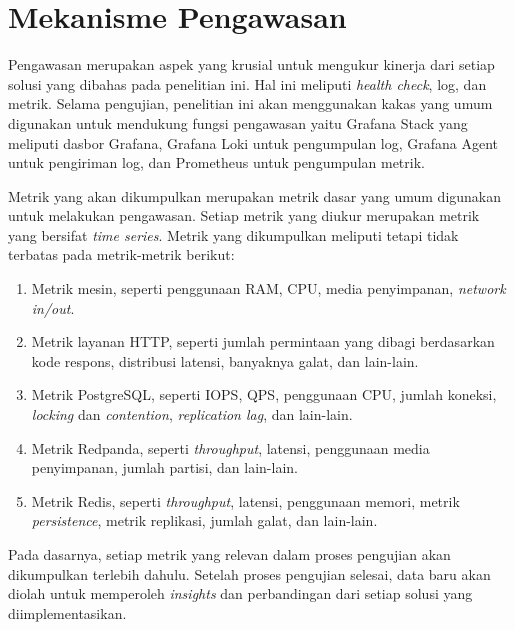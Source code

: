 \section{Mekanisme Pengawasan}

Pengawasan merupakan aspek yang krusial untuk mengukur kinerja dari setiap solusi yang dibahas pada penelitian ini. Hal ini meliputi \textit{health check}, log, dan metrik. Selama pengujian, penelitian ini akan menggunakan kakas yang umum digunakan untuk mendukung fungsi pengawasan yaitu Grafana Stack yang meliputi dasbor Grafana, Grafana Loki untuk pengumpulan log, Grafana Agent untuk pengiriman log, dan Prometheus untuk pengumpulan metrik.

Metrik yang akan dikumpulkan merupakan metrik dasar yang umum digunakan untuk melakukan pengawasan. Setiap metrik yang diukur merupakan metrik yang bersifat \textit{time series}. Metrik yang dikumpulkan meliputi tetapi tidak terbatas pada metrik-metrik berikut:

\begin{enumerate}
    \item Metrik mesin, seperti penggunaan RAM, CPU, media penyimpanan, \textit{network in/out}.
    \item Metrik layanan HTTP, seperti jumlah permintaan yang dibagi berdasarkan kode respons, distribusi latensi, banyaknya galat, dan lain-lain.
    \item Metrik PostgreSQL, seperti IOPS, QPS, penggunaan CPU, jumlah koneksi, \textit{locking} dan \textit{contention}, \textit{replication lag}, dan lain-lain.
    \item Metrik Redpanda, seperti \textit{throughput}, latensi, penggunaan media penyimpanan, jumlah partisi, dan lain-lain.
    \item Metrik Redis, seperti \textit{throughput}, latensi, penggunaan memori, metrik \textit{persistence}, metrik replikasi, jumlah galat, dan lain-lain.
\end{enumerate}

Pada dasarnya, setiap metrik yang relevan dalam proses pengujian akan dikumpulkan terlebih dahulu. Setelah proses pengujian selesai, data baru akan diolah untuk memperoleh \textit{insights} dan perbandingan dari setiap solusi yang diimplementasikan.